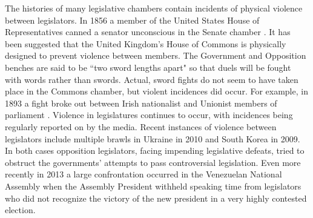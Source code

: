\documentclass[a4paper]{article}\usepackage[]{graphicx}\usepackage[]{color}
\begin{document}
The histories of many legislative chambers contain incidents of physical violence between legislators. In 1856 a member of the United States House of Representatives canned a senator unconscious in the Senate chamber \citep{USSenateCanning}. It has been suggested that the United Kingdom's House of Commons is physically designed to prevent violence between members. The Government and Opposition benches are said to be ``two sword lengths apart" \citep{ParliamentUKSword} so that duels will be fought with words rather than swords. Actual, sword fights do not seem to have taken place in the Commons chamber, but violent incidences did occur. For example, in 1893 a fight broke out between Irish nationalist and Unionist members of parliament \citep{ByrneViolence}. Violence in legislatures continues to occur, with incidences being regularly reported on by the media. Recent instances of violence between legislators include multiple brawls in Ukraine in 2010 and South Korea in 2009. In both cases opposition legislators, facing impending legislative defeats, tried to obstruct the governments' attempts to pass controversial legislation. Even more recently in 2013 a large confrontation occurred in the Venezuelan National Assembly when the Assembly President withheld speaking time from legislators who did not recognize the victory of the new president in a very highly contested election.
\end{document}
